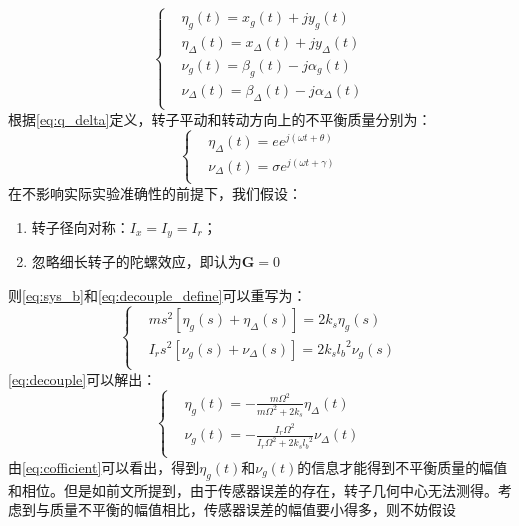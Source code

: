 \documentclass[
  lang=cn,
  degree=master,
  openany,oneside
]{nuaathesis}
\begin{document}
\begin{equation}
\label{eq:decouple_define}
\left\{
\begin{aligned}
& \eta _g(t) = x_g(t) + jy_g(t)\\
& \eta _{\Delta}(t) = x_{\Delta}(t) + jy_{\Delta}(t)\\
& \nu _g(t) = {\beta}_g(t) - j{\alpha}_g(t)\\
& \nu _{\Delta}(t) = {\beta}_{\Delta}(t) - j{\alpha}_{\Delta}(t)\\
\end{aligned}
\right.
\end{equation}
根据\autoref{eq:q_delta}定义，转子平动和转动方向上的不平衡质量分别为：
\begin{equation}
\label{eq:eta_nu_define}
\left\{
\begin{aligned}
&\eta _{\Delta}(t) = ee^{j(\omega t + \theta)} \\
&\nu _{\Delta}(t) = \sigma e^{j(\omega t + \gamma)} \\
\end{aligned}
\right.
\end{equation}
在不影响实际实验准确性的前提下，我们假设：
\begin{enumerate}
	\item 转子径向对称：$I_x = I_y = I_r$；
	\item 忽略细长转子的陀螺效应，即认为$\boldsymbol{G} = 0$
\end{enumerate}
则\autoref{eq:sys_b}和\autoref{eq:decouple_define}可以重写为：
\begin{equation}
\label{eq:decouple}
\left\{
\begin{aligned}
& ms^2\left[ \eta _g(s)+\eta_{\Delta}(s) \right] = 2k_s\eta _g(s)\\
& {I_r}s^2\left[ \nu _g(s)+\nu_{\Delta}(s) \right] = 2k_s{l_b}^2\nu _g(s)\\
\end{aligned}
\right.
\end{equation}
\autoref{eq:decouple}可以解出：
\begin{equation}
\label{eq:cofficient}
\left\{
\begin{aligned}
& \eta _g (t) = -\frac{m{\Omega}^2}{m{\Omega}^2+2k_s}\eta _{\Delta}(t)\\
& \nu _g (t) = -\frac{I_r{\Omega}^2}{I_r{\Omega}^2+2k_s{l_b}^2}\nu _{\Delta}(t)\\
\end{aligned}
\right.
\end{equation}
由\autoref{eq:cofficient}可以看出，得到$\eta _g(t)$和$\nu _g(t)$的信息才能得到不平衡质量的幅值和相位。但是如前文所提到，由于传感器误差的存在，转子几何中心无法测得。考虑到与质量不平衡的幅值相比，传感器误差的幅值要小得多，则不妨假设
\end{document}
